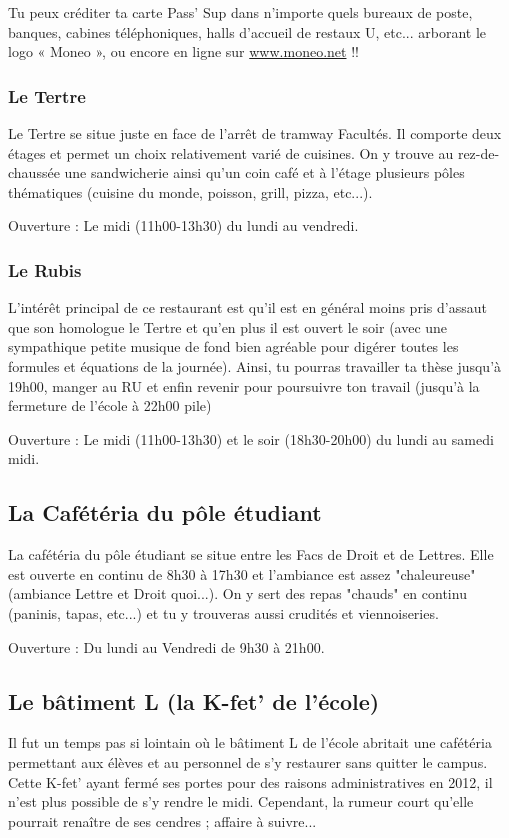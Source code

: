 Tu peux créditer ta carte Pass' Sup dans n'importe quels bureaux de poste, banques, cabines téléphoniques, halls d'accueil de restaux U, etc... arborant le logo « Moneo », ou encore en ligne sur \url{www.moneo.net} !!

\subsubsection{Le Tertre}
Le Tertre se situe juste en face de l'arrêt de tramway Facultés. Il comporte deux étages et permet un choix relativement varié de cuisines.
On y trouve au rez-de-chaussée une sandwicherie ainsi qu'un coin café et à l'étage plusieurs pôles thématiques (cuisine du monde, poisson, grill, pizza, etc...).

Ouverture : Le midi (11h00-13h30) du lundi au vendredi.

\subsubsection{Le Rubis}
L'intérêt principal de ce restaurant est qu'il est en général moins pris d'assaut que son homologue le Tertre et qu'en plus il est ouvert le soir (avec une sympathique petite musique de fond bien agréable pour digérer toutes les formules et équations de la journée).
Ainsi, tu pourras travailler ta thèse jusqu'à 19h00, manger au RU et enfin revenir pour poursuivre ton travail (jusqu'à la fermeture de l'école à 22h00 pile)

Ouverture : Le midi (11h00-13h30) et le soir (18h30-20h00) du lundi au samedi midi.

\subsection{La Cafétéria du pôle étudiant}
La cafétéria du pôle étudiant se situe entre les Facs de Droit et de Lettres.
Elle est ouverte en continu de 8h30 à 17h30 et l'ambiance est assez "chaleureuse" (ambiance Lettre et Droit quoi...).
On y sert des repas "chauds" en continu (paninis, tapas, etc...) et tu y trouveras aussi crudités et viennoiseries.

Ouverture : Du lundi au Vendredi de 9h30 à 21h00.

\subsection{Le bâtiment L (la K-fet' de l'école)}
Il fut un temps pas si lointain où le bâtiment L de l'école abritait une cafétéria permettant aux élèves et au personnel de s'y restaurer sans quitter le campus.
Cette K-fet' ayant fermé ses portes pour des raisons administratives en 2012, il n'est plus possible de s'y rendre le midi.
Cependant, la rumeur court qu'elle pourrait renaître de ses cendres ; affaire à suivre...


